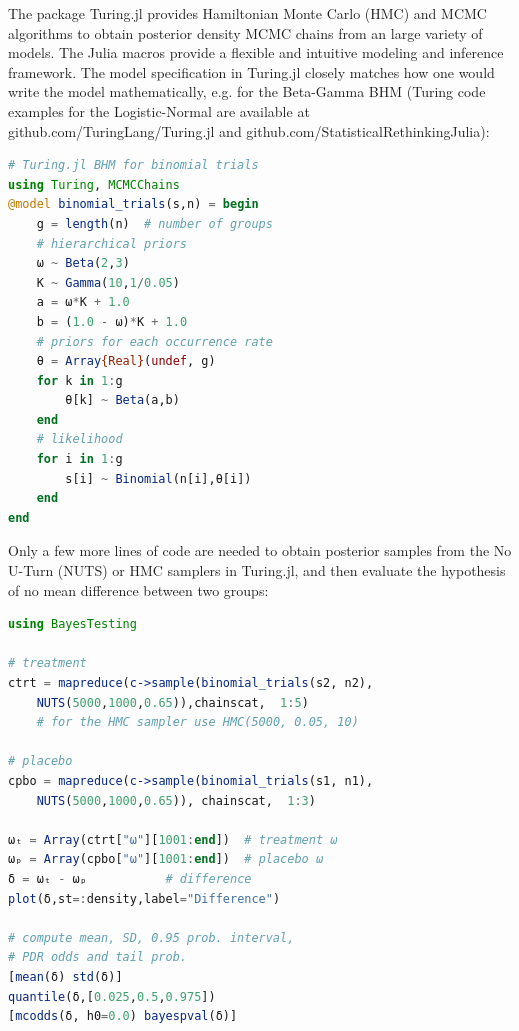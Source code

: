 \documentclass{juliacon}
\begin{document}
{\vskip 6pt
The package Turing.jl provides Hamiltonian Monte Carlo (HMC) and MCMC algorithms to obtain posterior density MCMC chains from an large variety of models. The Julia macros provide a flexible and intuitive modeling and inference framework. The model specification in Turing.jl closely matches how one would write the model mathematically, e.g. for the Beta-Gamma BHM (Turing code examples for the Logistic-Normal are available at github.com/TuringLang/Turing.jl and github.com/StatisticalRethinkingJulia):
\begin{lstlisting}[language = Julia]
# Turing.jl BHM for binomial trials
using Turing, MCMCChains
@model binomial_trials(s,n) = begin
	g = length(n)  # number of groups
	# hierarchical priors
	ω ~ Beta(2,3)
	K ~ Gamma(10,1/0.05)
	a = ω*K + 1.0
	b = (1.0 - ω)*K + 1.0
	# priors for each occurrence rate
	θ = Array{Real}(undef, g)
	for k in 1:g
		θ[k] ~ Beta(a,b)
	end
	# likelihood
	for i in 1:g
		s[i] ~ Binomial(n[i],θ[i])
	end
end
\end{lstlisting}

Only a few more lines of code are needed to obtain posterior samples from the No U-Turn (NUTS) or HMC samplers in Turing.jl, and then evaluate the hypothesis of no mean difference between two groups:
\begin{lstlisting}[language = Julia]
using BayesTesting

# treatment
ctrt = mapreduce(c->sample(binomial_trials(s2, n2),
	NUTS(5000,1000,0.65)),chainscat,  1:5)
	# for the HMC sampler use HMC(5000, 0.05, 10)

# placebo
cpbo = mapreduce(c->sample(binomial_trials(s1, n1),
	NUTS(5000,1000,0.65)), chainscat,  1:3)

ωₜ = Array(ctrt["ω"][1001:end])  # treatment ω
ωₚ = Array(cpbo["ω"][1001:end])  # placebo ω
δ = ωₜ - ωₚ           # difference
plot(δ,st=:density,label="Difference")

# compute mean, SD, 0.95 prob. interval,
# PDR odds and tail prob.
[mean(δ) std(δ)]
quantile(δ,[0.025,0.5,0.975])
[mcodds(δ, h0=0.0) bayespval(δ)]
\end{lstlisting}

}
\end{document}
